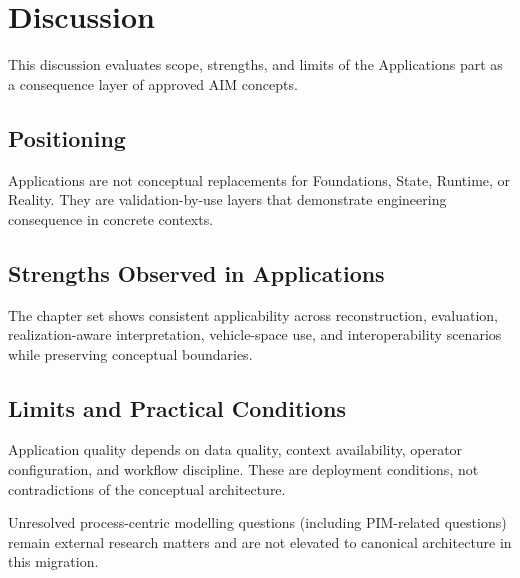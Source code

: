 
\chapter{Discussion}

\label{chap:applications-discussion}

This discussion evaluates scope, strengths, and limits of the
Applications part as a consequence layer of approved AIM concepts.

\section{Positioning}

Applications are not conceptual replacements for Foundations, State,
Runtime, or Reality. They are validation-by-use layers that demonstrate
engineering consequence in concrete contexts.

\section{Strengths Observed in Applications}

The chapter set shows consistent applicability across reconstruction,
evaluation, realization-aware interpretation, vehicle-space use,
and interoperability scenarios while preserving conceptual boundaries.

\section{Limits and Practical Conditions}

Application quality depends on data quality, context availability,
operator configuration, and workflow discipline. These are deployment
conditions, not contradictions of the conceptual architecture.

Unresolved process-centric modelling questions (including PIM-related
questions) remain external research matters and are not elevated to
canonical architecture in this migration.

